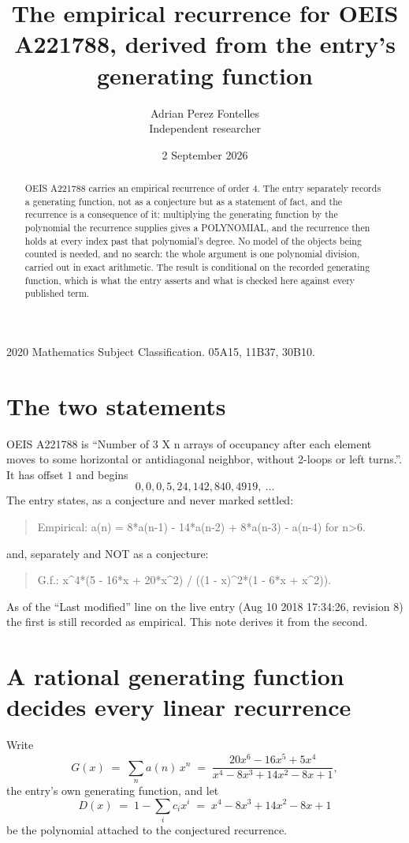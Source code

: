 \documentclass[11pt,a4paper]{article}
\title{The empirical recurrence for OEIS A221788, derived from the entry's generating function}
\author{Adrian Perez Fontelles\\ \small Independent researcher}
\date{2 September 2026}
\theoremstyle{plain}
\theoremstyle{definition}
\begin{document}
\maketitle

\begin{abstract}
OEIS A221788 carries an empirical recurrence of order $4$. The entry separately records a
generating function, not as a conjecture but as a statement of fact, and the recurrence is a
consequence of it: multiplying the generating function by the polynomial the recurrence
supplies gives a POLYNOMIAL, and the recurrence then holds at every index past that
polynomial's degree. No model of the objects being counted is needed, and no search: the
whole argument is one polynomial division, carried out in exact arithmetic. The result is
conditional on the recorded generating function, which is what the entry asserts and what is
checked here against every published term.
\end{abstract}

\noindent\small 2020 Mathematics Subject Classification. 05A15, 11B37, 30B10.\normalsize

\section{The two statements}

OEIS A221788 is ``Number of 3 X n arrays of occupancy after each element moves to some horizontal or antidiagonal neighbor, without 2-loops or left turns.''. It has offset $1$ and begins
\[
0, 0, 0, 5, 24, 142, 840, 4919,\ \dots
\]
The entry states, as a conjecture and never marked settled:
\begin{quote}
Empirical: a(n) = 8*a(n-1) - 14*a(n-2) + 8*a(n-3) - a(n-4) for n>6.
\end{quote}
and, separately and NOT as a conjecture:
\begin{quote}
G.f.: x\^{}4*(5 - 16*x + 20*x\^{}2) / ((1 - x)\^{}2*(1 - 6*x + x\^{}2)).
\end{quote}
As of the ``Last modified'' line on the live entry (Aug 10 2018 17:34:26, revision 8) the first is still
recorded as empirical. This note derives it from the second.

\section{A rational generating function decides every linear recurrence}

Write
\[
G(x)\;=\;\sum_{n}a(n)\,x^{n}\;=\;\frac{20 x^{6} - 16 x^{5} + 5 x^{4}}{x^{4} - 8 x^{3} + 14 x^{2} - 8 x + 1},
\]
the entry's own generating function, and let
\[
D(x)\;=\;1-\sum_i c_i x^{i}\;=\;x^{4} - 8 x^{3} + 14 x^{2} - 8 x + 1
\]
be the polynomial attached to the conjectured recurrence.
\end{document}
